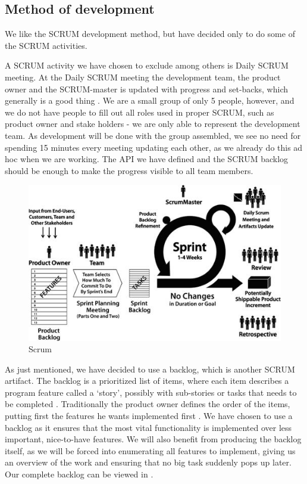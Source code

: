 \subsection{Method of development}
We like the SCRUM development method, but have decided only to do some of the SCRUM activities.

A SCRUM activity we have chosen to exclude among others is Daily SCRUM meeting.
At the Daily SCRUM meeting the development team, the product owner and the SCRUM-master is updated with progress and set-backs, which generally is a good thing \cite[p. ?]{?}.
We are a small group of only 5 people, however, and we do not have people to fill out all roles used in proper SCRUM, such as product owner and stake holders - we are only able to represent the development team.
As development will be done with the group assembled, we see no need for spending 15 minutes every meeting updating each other, as we already do this ad hoc when we are working.
The API we have defined and the SCRUM backlog should be enough to make the progress visible to all team members.

\begin{figure}[H]
  \includegraphics[width=\textwidth]{illustrations/scrum.jpg}
  \caption{Scrum}
  \label{scrum_picture}
\end{figure}

As just mentioned, we have decided to use a backlog, which is another SCRUM artifact.
The backlog is a prioritized list of items, where each item describes a program feature called a `story', possibly with sub-stories or tasks that needs to be completed \cite[p. ?]{?}. Traditionally the product owner defines the order of the items, putting first the features he wants implemented first \cite[p. ?]{?}.
We have chosen to use a backlog as it ensures that the most vital functionality is implemented over less important, nice-to-have features. We will also benefit from producing the backlog itself, as we will be forced into enumerating all features to implement, giving us an overview of the work and ensuring that no big task suddenly pops up later.
Our complete backlog can be viewed in .

